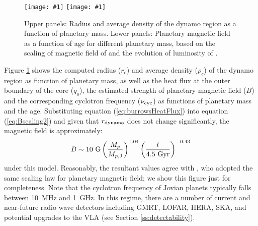 \documentclass[iop,numberedappendix,apj]{emulateapj}
\def\plotoneh#1{\centering \leavevmode
\texttt{[image: \#1]}}
\begin{document}
\begin{figure}[bhtp]
   \plotoneh{rho_r_dynamo.pdf}
   \plotoneh{qBf_Christensen.pdf}
   \caption{Upper panels: Radius and average density of the dynamo region as a function of planetary mass. Lower panels: Planetary magnetic field as a function of age for different planetary mass, based on the scaling of magnetic field of \citet{christensen2010} and the evolution of luminosity of \citet{burrows_et_al2001}.} 
  \label{fig:planetaryB}
\end{figure}

Figure \ref{fig:planetaryB} shows the computed radius ($r_c$) and average density ($\rho_c$) of the dynamo region as function of planetary mass, as well as the heat flux at the outer boundary of the core ($q_o$), the estimated strength of planetary magnetic field ($B$) and the corresponding cyclotron frequency ($\nu_{\rm cyc}$) as functions of planetary mass and the age. 
Substituting equation (\ref{eq:burrowsHeatFlux}) into equation (\ref{eq:Bscaling2}) and given that $r_{\rm dynamo} $ does not change significantly, the magnetic field is approximately:
\begin{equation}
B   \sim   10~{\rm G} \left( \frac{M_p }{M_{p,{\rm J}}} \right)^{1.04} \left( \frac{t}{4.5~\rm{Gyr}} \right)^{-0.43} \label{eq:scalingB}
\end{equation}
under this model. 
Reasonably, the resultant values agree with \citet{reiners2010}, who adopted the same scaling law for planetary magnetic field; we show this figure just for completeness. 
Note that the cyclotron frequency of Jovian planets typically falls between 10~MHz and 1~GHz. 
In this regime, there are a number of current and near-future radio wave detectors including GMRT, 
LOFAR, HERA, SKA, and potential upgrades to the VLA (see Section \ref{ss:detectability}). 
\end{document}
